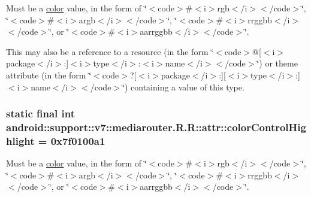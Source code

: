 Must be a \hyperlink{classandroid_1_1support_1_1v7_1_1mediarouter_1_1_r_1_1color}{color} value, in the form of \char`\"{}$<$code$>$\#$<$i$>$rgb$<$/i$>$$<$/code$>$\char`\"{}, \char`\"{}$<$code$>$\#$<$i$>$argb$<$/i$>$$<$/code$>$\char`\"{}, \char`\"{}$<$code$>$\#$<$i$>$rrggbb$<$/i$>$$<$/code$>$\char`\"{}, or \char`\"{}$<$code$>$\#$<$i$>$aarrggbb$<$/i$>$$<$/code$>$\char`\"{}. 

This may also be a reference to a resource (in the form \char`\"{}$<$code$>$@\mbox{[}$<$i$>$package$<$/i$>$:\mbox{]}$<$i$>$type$<$/i$>$:$<$i$>$name$<$/i$>$$<$/code$>$\char`\"{}) or theme attribute (in the form \char`\"{}$<$code$>$?\mbox{[}$<$i$>$package$<$/i$>$:\mbox{]}\mbox{[}$<$i$>$type$<$/i$>$:\mbox{]}$<$i$>$name$<$/i$>$$<$/code$>$\char`\"{}) containing a value of this type. \hypertarget{classandroid_1_1support_1_1v7_1_1mediarouter_1_1_r_1_1attr_11a081f0c412004bb234c86d329d7f74}{
\subsubsection[{colorControlHighlight}]{\setlength{\rightskip}{0pt plus 5cm}static final int android::support::v7::mediarouter.R.R::attr::colorControlHighlight = 0x7f0100a1}}
\label{classandroid_1_1support_1_1v7_1_1mediarouter_1_1_r_1_1attr_11a081f0c412004bb234c86d329d7f74}


Must be a \hyperlink{classandroid_1_1support_1_1v7_1_1mediarouter_1_1_r_1_1color}{color} value, in the form of \char`\"{}$<$code$>$\#$<$i$>$rgb$<$/i$>$$<$/code$>$\char`\"{}, \char`\"{}$<$code$>$\#$<$i$>$argb$<$/i$>$$<$/code$>$\char`\"{}, \char`\"{}$<$code$>$\#$<$i$>$rrggbb$<$/i$>$$<$/code$>$\char`\"{}, or \char`\"{}$<$code$>$\#$<$i$>$aarrggbb$<$/i$>$$<$/code$>$\char`\"{}. 

